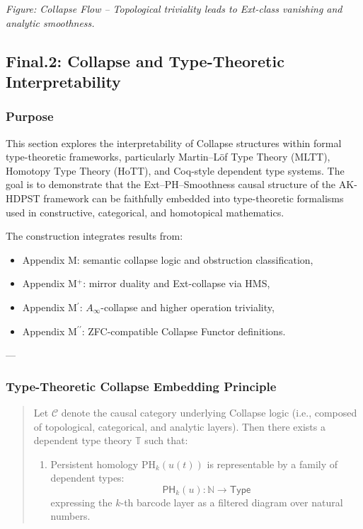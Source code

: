 \documentclass[11pt]{article}
\begin{document}
\begin{axiom}
\begin{axiom}
{{\begin{minipage}{\textwidth}
\small\textit{Figure: Collapse Flow – Topological triviality leads to Ext-class vanishing and analytic smoothness.}
\end{minipage}



\subsection*{Final.2: Collapse and Type-Theoretic Interpretability}

\subsubsection*{Purpose}

This section explores the interpretability of Collapse structures within formal type-theoretic frameworks,  
particularly Martin--L\"of Type Theory (MLTT), Homotopy Type Theory (HoTT), and Coq-style dependent type systems.  
The goal is to demonstrate that the Ext--PH--Smoothness causal structure of the AK-HDPST framework  
can be faithfully embedded into type-theoretic formalisms used in constructive, categorical, and homotopical mathematics.

The construction integrates results from:
\begin{itemize}
  \item Appendix M: semantic collapse logic and obstruction classification,
  \item Appendix M$^+$: mirror duality and Ext-collapse via HMS,
  \item Appendix M$^\prime$: $A_\infty$-collapse and higher operation triviality,
  \item Appendix M$^{\prime\prime}$: ZFC-compatible Collapse Functor definitions.
\end{itemize}

---

\subsubsection*{Type-Theoretic Collapse Embedding Principle}

\begin{quote}
Let \( \mathcal{C} \) denote the causal category underlying Collapse logic  
(i.e., composed of topological, categorical, and analytic layers).  
Then there exists a dependent type theory \( \mathbb{T} \) such that:
\begin{enumerate}
  \item Persistent homology \( \mathrm{PH}_k(u(t)) \) is representable by a family of dependent types:  
  \[
  \mathsf{PH}_k(u) : \mathbb{N} \to \mathsf{Type}
  \]
  expressing the \(k\)-th barcode layer as a filtered diagram over natural numbers.


\end{enumerate}
\end{quote}}}
\end{axiom}
\end{axiom}
\end{document}
